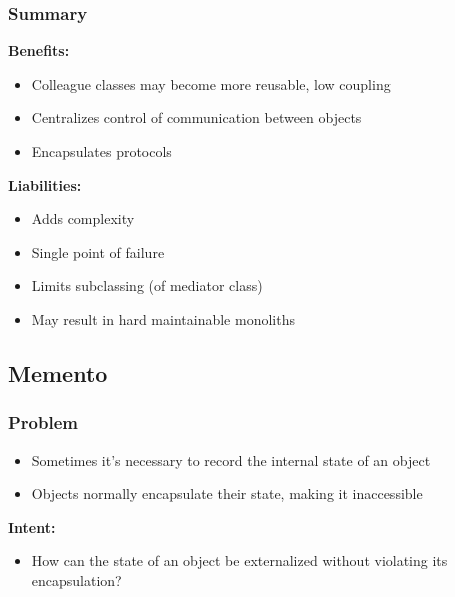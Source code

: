 \subsubsection{Summary}
\textbf{Benefits:}
\begin{itemize}
    \item Colleague classes may become more reusable, low coupling
    \item Centralizes control of communication between objects
    \item Encapsulates protocols
\end{itemize}
\textbf{Liabilities:}
\begin{itemize}
    \item Adds complexity
    \item Single point of failure
    \item Limits subclassing (of mediator class)
    \item May result in hard maintainable monoliths
\end{itemize}

\subsection{Memento}
\subsubsection{Problem}
\begin{itemize}
    \item Sometimes it's necessary to record the internal state of an object
    \item Objects normally encapsulate their state, making it inaccessible
\end{itemize}
\textbf{Intent:}
\begin{itemize}
    \item How can the state of an object be externalized without violating its encapsulation?
\end{itemize}
